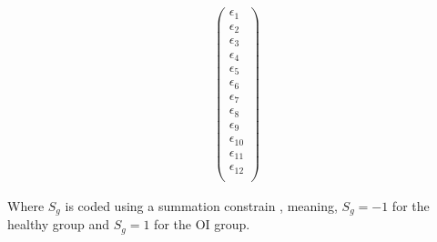 \documentclass[a4paper,fleqn]{DC_ArtStyle}
\begin{document}
\begin{equation}
\begin{split}
\begin{pmatrix}
			\epsilon_{1} \\
			\epsilon_{2} \\
			\epsilon_{3} \\
			\epsilon_{4} \\
			\epsilon_{5} \\
			\epsilon_{6} \\
			\epsilon_{7} \\
			\epsilon_{8} \\
			\epsilon_{9} \\
			\epsilon_{10} \\
			\epsilon_{11} \\
			\epsilon_{12} \\
		\end{pmatrix}
	\end{split}
\end{equation}

Where $S_g$ is coded using a summation constrain \cite{Fox2016}, meaning, $S_g = -1$ for the healthy group and $S_g = 1$ for the OI group. 



\end{document}

